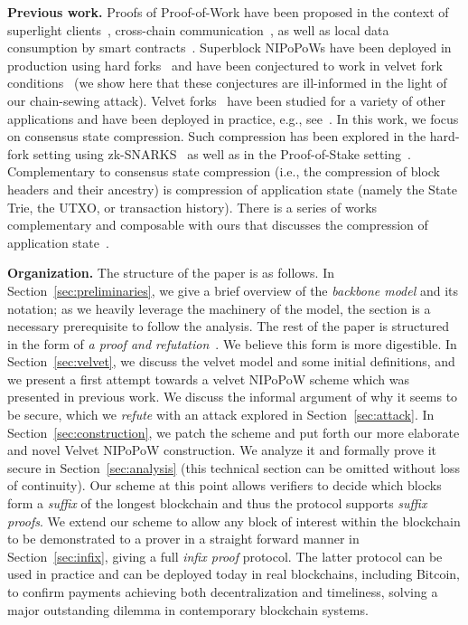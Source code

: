 \noindent
\textbf{Previous work.} Proofs of Proof-of-Work have been proposed in the
context of superlight clients~\cite{pow,nipopows,flyclient},
cross-chain communication~\cite{pow-sidechains,burn,crosschain-sok}, as well as
local data consumption by smart contracts~\cite{derivatives}. Superblock
NIPoPoWs have been deployed in production using hard forks~\cite{ergo} and have
been conjectured to work in velvet fork conditions~\cite{nipopows} (we show
here that these conjectures are ill-informed in the light of our chain-sewing
attack). Velvet forks~\cite{velvet} have been studied for a variety of other
applications and have been deployed in practice, e.g., see~\cite{gtklocker}. In this work,
we focus on consensus state compression. Such compression has been explored in
the hard-fork setting using zk-SNARKS~\cite{coda} as well as in the
Proof-of-Stake setting~\cite{pos-sidechains}. Complementary to consensus state
compression (i.e., the compression of block headers and their ancestry) is
compression of application state (namely the State Trie, the UTXO, or
transaction history). There is a series of works complementary and composable with ours that
discusses the compression of application state~\cite{edrax,ethanos}.

\noindent
\textbf{Organization.}
The structure of the paper is as follows. In Section~\ref{sec:preliminaries}, we
give a brief overview of the \emph{backbone model} and its notation; as we
heavily leverage the machinery of the model, the section is a necessary
prerequisite to follow the analysis. The rest of the paper is structured in the
form of \emph{a proof and refutation}~\cite{lakatos}. We believe this form is
more digestible. In Section~\ref{sec:velvet}, we discuss the velvet model and
some initial definitions, and we present a first attempt towards a velvet
NIPoPoW scheme which was presented in previous work. We discuss the informal
argument of why it seems to be secure, which we \emph{refute} with an attack explored
in Section~\ref{sec:attack}. In Section~\ref{sec:construction}, we patch the
scheme and put forth our more elaborate and novel Velvet NIPoPoW construction.
We analyze it and formally prove it secure in Section~\ref{sec:analysis} (this
technical section can be omitted without loss of continuity). Our scheme at this
point allows verifiers to decide which blocks form a \emph{suffix} of the
longest blockchain and thus the protocol supports \emph{suffix proofs}. We
extend our scheme to allow any block of interest within the blockchain to be
demonstrated to a prover in a straight forward manner in
Section~\ref{sec:infix}, giving a full \emph{infix proof} protocol. The latter
protocol can be used in practice and can be deployed today in real blockchains,
including Bitcoin, to confirm payments achieving both decentralization and
timeliness, solving a major outstanding dilemma in contemporary blockchain
systems.